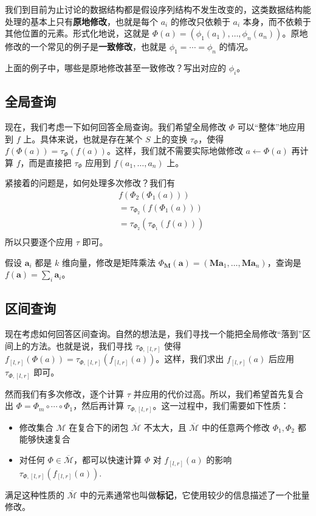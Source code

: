 我们到目前为止讨论的数据结构都是假设序列结构不发生改变的，这类数据结构能处理的基本上只有\textbf{原地修改}，也就是每个 $a_i$ 的修改只依赖于 $a_i$ 本身，而不依赖于其他位置的元素。形式化地说，这就是 $\Phi(a)=(\phi_1(a_1),\ldots,\phi_n(a_n))$。原地修改的一个常见的例子是\textbf{一致修改}，也就是 $\phi_1=\cdots=\phi_n$ 的情况。

\begin{exercise}
    上面的例子中，哪些是原地修改甚至一致修改？写出对应的 $\phi_i$。
\end{exercise}

\subsection{全局查询}


现在，我们考虑一下如何回答全局查询。我们希望全局修改 $\Phi$ 可以“整体”地应用到 $f$ 上。具体来说，也就是存在某个 $S$ 上的变换 $\tau_\Phi$，使得 $f(\Phi(a))=\tau_{\Phi}(f(a))$。这样，我们就不需要实际地做修改 $a\gets\Phi(a)$ 再计算 $f$，而是直接把 $\tau_\Phi$ 应用到 $f(a_1,\ldots,a_n)$ 上。

紧接着的问题是，如何处理多次修改？我们有
$$
\begin{aligned}
&f(\Phi_2(\Phi_1(a)))\\
&=\tau_{\Phi_2}(f(\Phi_1(a)))\\
&=\tau_{\Phi_2}(\tau_{\Phi_1}(f(a)))\\
\end{aligned}
$$
所以只要逐个应用 $\tau$ 即可。
\begin{example}[矩阵乘法]
    假设 $\mathbf a_i$ 都是 $k$ 维向量，修改是矩阵乘法 $\Phi_{\mathbf M}(\mathbf a)=(\mathbf M \mathbf a_1,\ldots,\mathbf M \mathbf a_n)$，查询是 $f(\mathbf a)=\sum_i \mathbf a_i$。
\end{example}

\subsection{区间查询}

现在考虑如何回答区间查询。自然的想法是，我们寻找一个能把全局修改“落到”区间上的方法。也就是说，我们寻找 $\tau_{\Phi,[l,r]}$ 使得 $f_{[l,r]}(\Phi(a))=\tau_{\Phi,[l,r]}(f_{[l,r]}(a))$。这样，我们求出 $f_{[l,r]}(a)$ 后应用 $\tau_{\Phi,[l,r]}$ 即可。

然而我们有多次修改，逐个计算 $\tau$ 并应用的代价过高。所以，我们希望首先复合出 $\Phi=\Phi_m\circ\cdots\circ \Phi_1$，然后再计算 $\tau_{\Phi,[l,r]}$。这一过程中，我们需要如下性质：
\begin{itemize}
    \item 修改集合 $\mathcal M$ 在复合下的闭包 $\overline{\mathcal M}$ 不太大，且 $\overline{\mathcal M}$ 中的任意两个修改 $\Phi_1,\Phi_2$ 都能够快速复合
    \item 对任何 $\Phi\in\overline{\mathcal M}$，都可以快速计算 $\Phi$ 对 $f_{[l,r]}(a)$ 的影响 $\tau_{\Phi,[l,r]}(f_{[l,r]}(a))$.
\end{itemize}
满足这种性质的 $\overline{\mathcal M}$ 中的元素通常也叫做\textbf{标记}，它使用较少的信息描述了一个批量修改。

